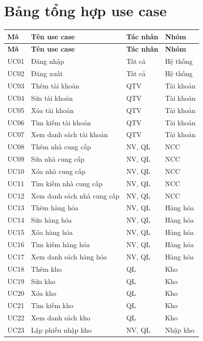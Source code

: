\section{Bảng tổng hợp use case}

\begin{longtable}{|p{1.1cm}|p{4.8cm}|p{3.2cm}|p{3.5cm}|}
\hline
\textbf{Mã} & \textbf{Tên use case} & \textbf{Tác nhân} & \textbf{Nhóm} \\
\hline
\endfirsthead
\hline
\textbf{Mã} & \textbf{Tên use case} & \textbf{Tác nhân} & \textbf{Nhóm} \\
\hline
\endhead
UC01 & Đăng nhập & Tất cả & Hệ thống \\
\hline
UC02 & Đăng xuất & Tất cả & Hệ thống \\
\hline
UC03 & Thêm tài khoản & QTV & Tài khoản \\
\hline
UC04 & Sửa tài khoản & QTV & Tài khoản \\
\hline
UC05 & Xóa tài khoản & QTV & Tài khoản \\
\hline
UC06 & Tìm kiếm tài khoản & QTV & Tài khoản \\
\hline
UC07 & Xem danh sách tài khoản & QTV & Tài khoản \\
\hline
UC08 & Thêm nhà cung cấp & NV, QL & NCC \\
\hline
UC09 & Sửa nhà cung cấp & NV, QL & NCC \\
\hline
UC10 & Xóa nhà cung cấp & NV, QL & NCC \\
\hline
UC11 & Tìm kiếm nhà cung cấp & NV, QL & NCC \\
\hline
UC12 & Xem danh sách nhà cung cấp & NV, QL & NCC \\
\hline
UC13 & Thêm hàng hóa & NV, QL & Hàng hóa \\
\hline
UC14 & Sửa hàng hóa & NV, QL & Hàng hóa \\
\hline
UC15 & Xóa hàng hóa & NV, QL & Hàng hóa \\
\hline
UC16 & Tìm kiếm hàng hóa & NV, QL & Hàng hóa \\
\hline
UC17 & Xem danh sách hàng hóa & NV, QL & Hàng hóa \\
\hline
UC18 & Thêm kho & QL & Kho \\
\hline
UC19 & Sửa kho & QL & Kho \\
\hline
UC20 & Xóa kho & QL & Kho \\
\hline
UC21 & Tìm kiếm kho & QL & Kho \\
\hline
UC22 & Xem danh sách kho & QL & Kho \\
\hline
UC23 & Lập phiếu nhập kho & NV, QL & Nhập kho \\

\end{longtable}
